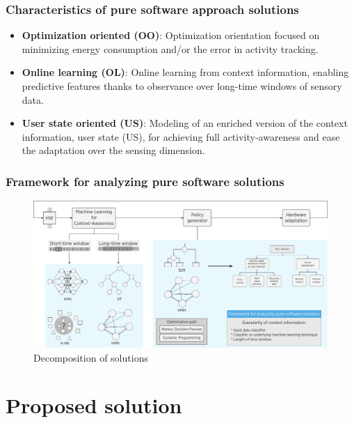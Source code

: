 \documentclass[compress,9pt,xcolor={dvipsnames,table}]{beamer}
\begin{document}
\begin{frame}[t]\frametitle{Characteristics of pure software approach solutions}
\begin{tcolorbox}[title=Distinctive characteristics of pure software solutions,colframe=PineGreen]
\small
\begin{itemize}
  \item \textbf{Optimization oriented (OO)}: Optimization orientation focused on minimizing energy consumption and/or the error in activity tracking.
  \item \textbf{Online learning (OL)}: Online learning from context information, enabling predictive features thanks to observance over long-time windows of sensory data.
  \item \textbf{User state oriented (US)}: Modeling of an enriched version of the context information, user state (US), for achieving full activity-awareness and ease the adaptation over the sensing dimension.
\end{itemize}
\end{tcolorbox}
\end{frame}


\begin{frame}[t]\frametitle{Framework for analyzing pure software solutions}
\begin{figure}[tb]
  \centering
  \includegraphics[width=\textwidth]{../../../resources/images/vectors/dual-taxonomy}
  \caption{Decomposition of solutions}
  \label{fig:dual-taxonomy}
  \end{figure}
\end{frame}


\section{Proposed solution}
\end{document}
